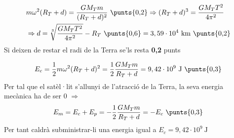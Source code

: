 \begin{solapartat}
\begin{align*}
&m\omega^2(R_T+d) = \frac{GM_Tm}{(R_T+d)^2} \ \text{\punts{0,2}} \Rightarrow (R_T+d)^3 = \frac{GM_TT^2}{4\pi^2}\\
&\Rightarrow d = \sqrt[3]{\frac{GM_TT^2}{4\pi^2}} - R_T \ \text{\punts{0,6}} = 3,59\cdot 10^{4}\ \mathrm{km} \ \text{\punts{0,2}}
\end{align*}
Si deixen de restar el radi de la Terra se'ls resta \textbf{0,2} punts
\end{solapartat}

\begin{solapartat}
\[ E_c = \frac{1}{2}m\omega^2(R_T+d)^2 = \frac{1}{2}\frac{GM_Tm}{R_T+d} = 9,42\cdot 10^{9}\ \mathrm{J} \ \text{\punts{0,3}} \]
Per tal que el satèl·lit s'allunyi de l'atracció de la Terra, la seva energia mecànica ha de ser 0  $\Rightarrow$
\[ E_m = E_c + E_p = -\frac{1}{2}\frac{GM_Tm}{R_T+d} = -E_c \ \text{\punts{0,3}} \]
Per tant caldrà subministrar-li una energia igual a $E_c = 9,42\cdot 10^{9}\ \mathrm{J}$ 
\end{solapartat}
